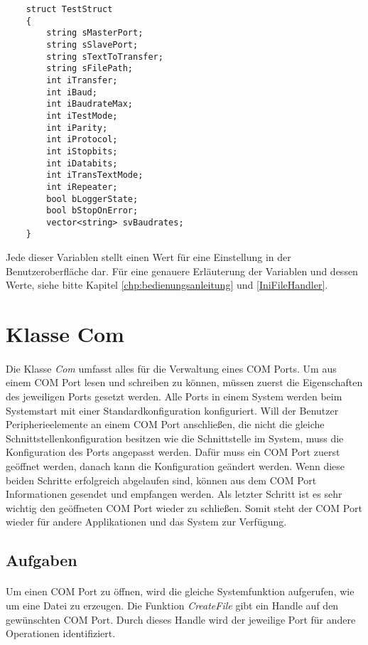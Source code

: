 \begin{lstlisting}	 
	struct TestStruct
	{
		string sMasterPort;
		string sSlavePort;
		string sTextToTransfer;
		string sFilePath;
		int iTransfer;
		int iBaud;
		int iBaudrateMax;
		int iTestMode;
		int iParity;
		int iProtocol;
		int iStopbits;
		int iDatabits;
		int iTransTextMode;
		int iRepeater;
		bool bLoggerState;
		bool bStopOnError;
		vector<string> svBaudrates;
	}
\end{lstlisting}

Jede dieser Variablen stellt einen Wert für eine Einstellung in der Benutzeroberfläche dar. Für eine genauere Erläuterung der Variablen und dessen Werte, siehe bitte Kapitel \ref{chp:bedienungsanleitung} und \ref{IniFileHandler}.

\newpage


\section{Klasse Com}
\paragraph{}
Die Klasse \textit{Com} umfasst alles für die Verwaltung eines COM Ports. Um aus einem COM Port lesen und schreiben zu können, müssen zuerst die Eigenschaften des jeweiligen Ports gesetzt werden. Alle Ports in einem System werden beim Systemstart mit einer Standardkonfiguration konfiguriert. Will der Benutzer Peripherieelemente an einem COM Port anschließen, die nicht die gleiche Schnittstellenkonfiguration besitzen wie die Schnittstelle im System, muss die Konfiguration des Ports angepasst werden. Dafür muss ein COM Port zuerst geöffnet werden, danach kann die Konfiguration geändert werden. Wenn diese beiden Schritte erfolgreich abgelaufen sind, können aus dem COM Port Informationen gesendet und empfangen werden. Als letzter Schritt ist es sehr wichtig den geöffneten COM Port wieder zu schließen. Somit steht der COM Port wieder für andere Applikationen und das System zur Verfügung.\\

\subsection{Aufgaben}
\paragraph{}
Um einen COM Port zu öffnen, wird die gleiche Systemfunktion aufgerufen, wie um eine Datei zu erzeugen. Die Funktion \textit{CreateFile} gibt ein Handle auf den gewünschten COM Port. Durch dieses Handle wird der jeweilige Port für andere Operationen identifiziert.

